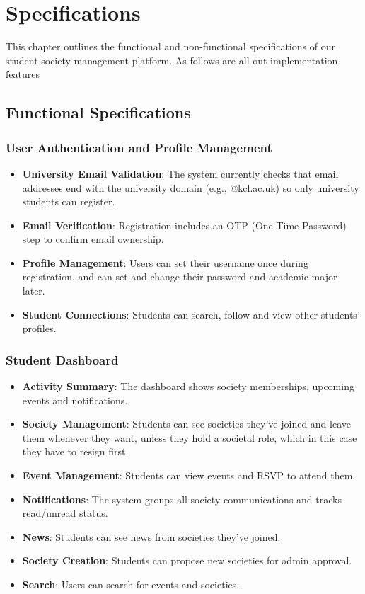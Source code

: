 \chapter{Specifications}

This chapter outlines the functional and non-functional specifications of our student society management platform. As follows are all out implementation features

\section{Functional Specifications}

\subsection{User Authentication and Profile Management}
\begin{itemize}
    \item \textbf{University Email Validation}: The system currently checks that email addresses end with the university domain (e.g., @kcl.ac.uk) so only university students can register.
    \item \textbf{Email Verification}: Registration includes an OTP (One-Time Password) step to confirm email ownership.
    \item \textbf{Profile Management}: Users can set their username once during registration, and can set and change their password and academic major later.
    \item \textbf{Student Connections}: Students can search, follow and view other students' profiles.
\end{itemize}

\subsection{Student Dashboard}
\begin{itemize}
    \item \textbf{Activity Summary}: The dashboard shows society memberships, upcoming events and notifications.
    \item \textbf{Society Management}: Students can see societies they've joined and leave them whenever they want, unless they hold a societal role, which in this case they have to resign first.
    \item \textbf{Event Management}: Students can view events and RSVP to attend them.
    \item \textbf{Notifications}: The system groups all society communications and tracks read/unread status.
    \item \textbf{News}: Students can see news from societies they've joined.
    \item \textbf{Society Creation}: Students can propose new societies for admin approval.
    \item \textbf{Search}: Users can search for events and societies.
\end{itemize}

